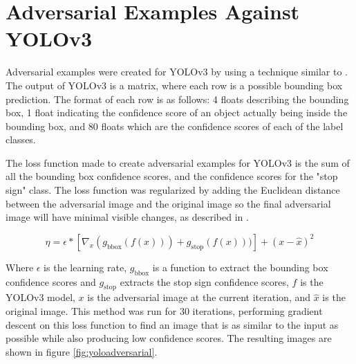 \documentclass{article}
\begin{document}
\section{Adversarial Examples Against YOLOv3}

Adversarial examples were created for YOLOv3 \cite{redmon2018yolov3} by using a technique similar to \cite{goodfellow2015explaining}. The output of YOLOv3 is a matrix, where each row is a possible bounding box prediction. The format of each row is as follows: 4 floats describing the bounding box, 1 float indicating the confidence score of an object actually being inside the bounding box, and 80 floats which are the confidence scores of each of the label classes.

The loss function made to create adversarial examples for YOLOv3 is the sum of all the bounding box confidence scores, and the confidence scores for the "stop sign" class. The loss function was regularized by adding the Euclidean distance between the adversarial image and the original image so the final adversarial image will have minimal visible changes, as described in \cite{szegedy2014intriguing}.

\begin{equation}
    \eta = \epsilon * [\nabla_{x} (g_{\text{bbox}}(f(x))) + g_{\text{stop}}(f(x)))] + (x - \hat{x})^2
\end{equation}

Where $\epsilon$ is the learning rate, $g_{\text{bbox}}$ is a function to extract the bounding box confidence scores and $g_{\text{stop}}$ extracts the stop sign confidence scores, $f$ is the YOLOv3 model, $x$ is the adversarial image at the current iteration, and $\hat{x}$ is the original image. This method was run for 30 iterations, performing gradient descent on this loss function to find an image that is as similar to the input as possible while also producing low confidence scores. The resulting images are shown in figure \ref{fig:yoloadversarial}.
\end{document}
